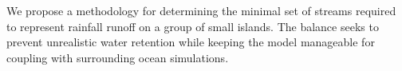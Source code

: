 We propose a methodology for determining the minimal set of streams required to represent rainfall runoff on a group of small islands. The balance seeks to prevent unrealistic water retention while keeping the model manageable for coupling with surrounding ocean simulations.
